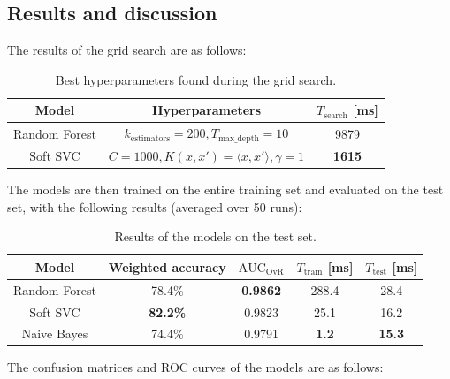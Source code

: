 \documentclass{article}
\begin{document}
\subsection{Results and discussion}
The results of the grid search are as follows:

\begin{table}[h]
    \centering
    \begin{tabular}{c|c|c}
        \toprule
        Model & Hyperparameters & $T_{\text{search}}$ [ms] \\
        \midrule
        Random Forest & $k_{\text{estimators}} = 200, T_{\text{max\_depth}} = 10$ & 9879 \\
        Soft SVC & $C = 1000, K(x, x') = \langle x, x' \rangle, \gamma = 1$ & \textbf{1615} \\
        \bottomrule
    \end{tabular}
    \caption{
        Best hyperparameters found during the grid search.
    }
    \label{tab:hyperparameters}
\end{table}

The models are then trained on the entire training set and evaluated on the test set, with the following results (averaged over 50 runs):

\begin{table}[h]
    \centering
    \begin{tabular}{c|c|c|c|c}
        \toprule
        Model & Weighted accuracy & $\text{AUC}_{\text{OvR}}$ & $T_{\text{train}}$ [ms] & $T_{\text{test}}$ [ms] \\
        \midrule
        Random Forest & 78.4\% & \textbf{0.9862} & 288.4 & 28.4 \\
        Soft SVC & \textbf{82.2\%} & 0.9823 & 25.1 & 16.2 \\
        Naive Bayes & 74.4\% & 0.9791 & \textbf{1.2} & \textbf{15.3} \\
        \bottomrule
    \end{tabular}
    \caption{
        Results of the models on the test set.
    }
    \label{tab:results}
\end{table}

The confusion matrices and ROC curves of the models are as follows:
\end{document}

